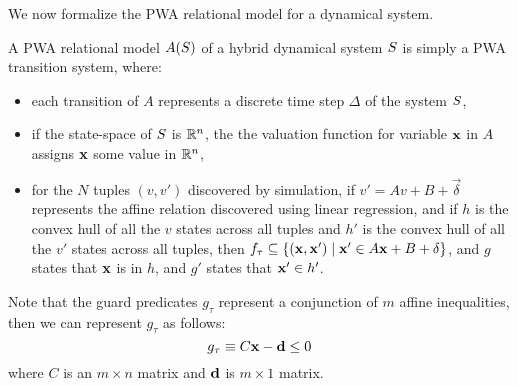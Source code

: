 We now formalize the PWA relational model for a dynamical system.
\begin{definition}

A PWA relational model $A(S)$ of a hybrid dynamical system
$S$ is simply a PWA transition system, where:

\begin{itemize}[noitemsep, leftmargin= 1.5 em]
\item
each transition of $A$ represents a discrete time step $\Delta$ of the
system $S$,
\item
if the state-space of $S$ is $\mathbb{R}^n$, the the valuation
function for variable $\mathbf{x}$ in $A$ assigns $\mathbf{x}$ some value in
$\mathbb{R}^n$,
\item
for the $N$ tuples $(v,v')$ discovered by simulation, if $v' = Av
+ B + \vec{\delta}$ represents the affine relation discovered using
linear regression, and if $h$ is the convex hull of all the $v$
states across all tuples and $h'$ is the convex hull of all the $v'$
states across all tuples, then $f_\tau \subseteq
\{(\mathbf{x},\mathbf{x}') \mid \mathbf{x}' \in A\mathbf{x} + B + \mathbf{\delta}\}$,
and $g$ states that $\mathbf{x}$ is in $h$, and $g'$ states that
$\mathbf{x}' \in h'$.
\end{itemize}

Note that the guard predicates $g_\tau$ represent a conjunction of $m$
affine inequalities, then we can represent $g_\tau$ as follows:
\[
g_\tau  \equiv C\mathbf{x} - \mathbf{d} \le 0
\]
where $C$ is an $m \times n$ matrix and $\mathbf{d}$ is $m \times 1$ matrix.


% 
\end{definition}

